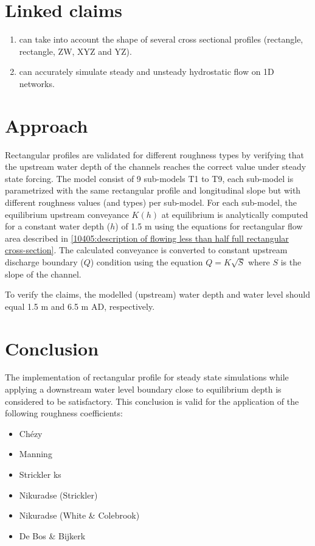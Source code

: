 \section*{Linked claims}
\begin{enumerate}
\item \dflowfm can take into account the shape of several cross sectional profiles (rectangle, rectangle, ZW, XYZ and YZ).
\item \dflowfm can accurately simulate steady and unsteady hydrostatic flow on 1D networks.
\end{enumerate}
\section*{Approach}
Rectangular profiles are validated for different roughness types by verifying that the upstream water depth of the channels reaches the correct value under steady state forcing. 
The model consist of 9 sub-models T1 to T9, each sub-model is parametrized with the same rectangular profile and longitudinal slope but with different roughness values (and types) per sub-model.
For each sub-model, the equilibrium upstream conveyance $K(h)$ at equilibrium is analytically computed for a constant water depth ($h$) of 1.5 m using the equations for rectangular flow area described in \autoref{10405:description of flowing less than half full rectangular cross-section}.
The calculated conveyance is converted to constant upstream discharge boundary ($Q$) condition using the equation $Q=K\sqrt{S}$ where $S$ is the slope of the channel. 

To verify the claims, the modelled (upstream) water depth and water level should equal 1.5 m and 6.5 m AD, respectively. 

\section*{Conclusion} 
The implementation of rectangular profile for steady state simulations while applying a downstream water level boundary close to equilibrium depth is considered to be satisfactory. 
This conclusion is valid for the application of the following roughness coefficients:

\begin{itemize}
\item Ch\'ezy
\item Manning
\item Strickler ks
\item Nikuradse (Strickler)
\item Nikuradse (White \& Colebrook) 
\item De Bos \& Bijkerk
\end{itemize}


